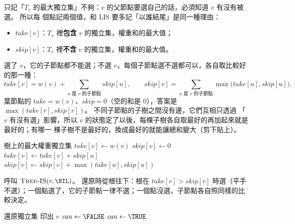 只記「$T_v$ 的最大獨立集」不夠：$v$ 的父節點要選自己的話，必須知道 $v$ 有沒有被選。 所以每
個點記兩個值，和 LIS 要多記「以誰結尾」是同一種理由：
\begin{itemize}
\item $\mathit{take}[v]$：$T_v$ 裡\textbf{包含} $v$ 的獨立集，權重和的最大值；
\item $\mathit{skip}[v]$：$T_v$ 裡\textbf{不含} $v$ 的獨立集，權重和的最大值。
\end{itemize}
選了 $v$，它的子節點都不能選；不選 $v$，每個子節點選不選都可以，各自取比較好的那一種：
\[
\mathit{take}[v] = w(v) + \sum_{u \text{ 是 } v \text{ 的子節點}} \mathit{skip}[u], \qquad
\mathit{skip}[v] = \sum_{u \text{ 是 } v \text{ 的子節點}} \max\bigl(\mathit{take}[u], \mathit{skip}[u]\bigr).
\]
葉節點的 $\mathit{take} = w(v)$、$\mathit{skip} = 0$（空的和是 $0$），答案是
$\max(\mathit{take}[r], \mathit{skip}[r])$。 不同子節點的子樹之間沒有邊，它們互相只透過
「$v$ 有沒有選」影響，所以 $v$ 的狀態定了以後，每棵子樹各自取最好的再加起來就是最好的；有哪一
棵子樹不是最好的，換成最好的就能讓總和變大（剪下貼上）。

\begin{pseudo}[label=alg:dp-tree-is]{樹上的最大權重獨立集}
 
    \State $\mathit{take}[v] \gets w(v)$
    \State $\mathit{skip}[v] \gets 0$
            \State {}
            \State $\mathit{take}[v] \gets \mathit{take}[v] + \mathit{skip}[u]$
            \State $\mathit{skip}[v] \gets \mathit{skip}[v] + \max(\mathit{take}[u], \mathit{skip}[u])$
        \EndIf
    \EndFor
\EndProcedure
\end{pseudo}

呼叫 $\proc{Tree-IS}(r, \NIL)$。 還原時從根往下：根在 $\mathit{take}[r] > \mathit{skip}[r]$
時選（平手不選）；一個點選了，它的子節點一律不選；一個點沒選，子節點各自照同樣的比較決定。

\begin{pseudo}[label=alg:dp-tree-is-pick]{還原獨立集}
 
        \State 印出 $v$
        \State $\mathit{can} \gets \FALSE$ 
    \Else
        \State $\mathit{can} \gets \TRUE$
    \EndIf
            \State {}
        \EndIf
    \EndFor
\EndProcedure
\end{pseudo}

